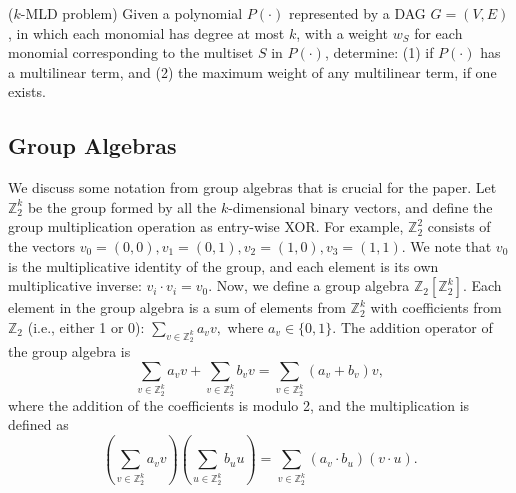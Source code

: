 \begin{problem} (\textsc{$k$-MLD} problem)
Given a polynomial $P(\cdot)$ represented by a DAG $G=(V, E)$, in which each monomial
has degree at most $k$, with a weight $w_S$ for
each monomial corresponding to the multiset $S$ in $P(\cdot)$, determine:
(1) if $P(\cdot)$ has a multilinear term, and 
(2) the maximum weight of any multilinear term, if one exists.
\end{problem}


\subsection{Group Algebras}
\label{sec:grpalgebra}
We discuss some notation from group algebras that is crucial for the paper. 
Let $\mathbb{Z}_2^k$ be the group formed by all the $k$-dimensional binary vectors, and define the group multiplication operation as entry-wise XOR. For example, $\mathbb{Z}_2^2$ consists of the vectors $v_0 = (0, 0), v_1 = (0, 1), v_2 = (1, 0), v_3 = (1, 1)$. We note that $v_0$ is the multiplicative identity of the group, and each element is its own multiplicative inverse: $v_i \cdot v_i = v_0$. Now, we define a group algebra $\mathbb{Z}_2[\mathbb{Z}_2^k]$. Each element in the group algebra is a sum of elements from $\mathbb{Z}_2^k$ with coefficients from $\mathbb{Z}_2$ (i.e., either 1 or 0):
$
\sum_{v\in \mathbb{Z}_2^k} a_v v,
$
where $a_v \in \{0,1\}$. The addition operator of the group algebra is
{\scriptsize
$$
\sum_{v\in \mathbb{Z}_2^k} a_v v + \sum_{v\in \mathbb{Z}_2^k} b_v v = \sum_{v\in \mathbb{Z}_2^k} (a_v + b_v) v,
$$}
where the addition of the coefficients is modulo 2, and the multiplication is defined as
{\scriptsize
$$
\left(\sum_{v\in \mathbb{Z}_2^k} a_v v\right)\left(\sum_{u\in \mathbb{Z}_2^k} b_u u\right) = \sum_{v\in \mathbb{Z}_2^k} (a_v \cdot b_u) (v\cdot u).
$$}



